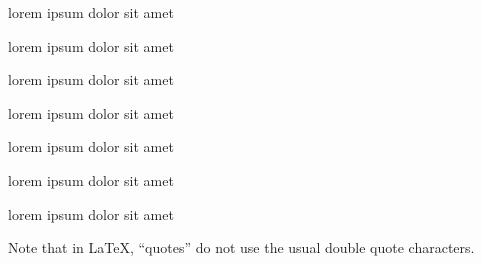 \begin{observation} lorem ipsum dolor sit amet \end{observation}

\begin{definition} lorem ipsum dolor sit amet \end{definition}

\begin{problem} lorem ipsum dolor sit amet \end{problem}

\begin{assumption} lorem ipsum dolor sit amet \end{assumption}

\begin{example} lorem ipsum dolor sit amet \end{example}

\begin{claim} lorem ipsum dolor sit amet \end{claim}

\begin{remark} lorem ipsum dolor sit amet \end{remark}

Note that in \LaTeX, ``quotes'' do not use the usual double quote characters.
